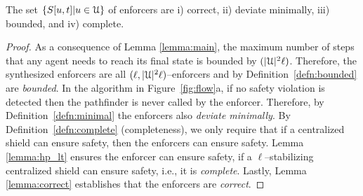 \begin{thm}
The set $\{S[u,t]|u \in \mathcal{U} \}$ of enforcers are i) correct, ii) deviate minimally, iii) bounded, and iv) complete.
\end{thm}
\begin{proof}
As a consequence of Lemma \ref{lemma:main}, the maximum number of steps that any agent needs to reach its final state is bounded by $(|\mathcal{U}|^2\ell)$. Therefore, the synthesized enforcers are all $(\ell,|\mathcal{U}|^2\ell)$--enforcers and by Definition~\ref{defn:bounded} are \emph{bounded}. In the algorithm in Figure~\ref{fig:flow}a, if no safety violation is detected then the pathfinder is never called by the enforcer. Therefore, by  Definition~\ref{defn:minimal} the enforcers also \emph{deviate minimally}. By Definition~\ref{defn:complete} (completeness), we only require that if a centralized shield can ensure safety, then the enforcers can ensure safety.  Lemma \ref{lemma:hp_lt} ensures the enforcer can ensure safety, if a $\ell$--stabilizing centralized shield can ensure safety, i.e., it is \emph{complete}. Lastly, Lemma \ref{lemma:correct} establishes that the enforcers are \emph{correct}.
\end{proof}







